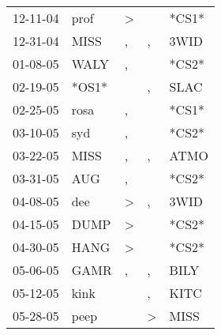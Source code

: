 \begin{supertabular}{p{0.07\textwidth}p{0.06\textwidth}p{0.02\textwidth}p{0.02\textwidth}p{0.06\textwidth}}
          12-11-04\textsuperscript{} &           prof\textsuperscript{} &     \textgreater &                  &                            *CS1* \\
          12-31-04\textsuperscript{} &           MISS\textsuperscript{} &                , &                , &           3WID\textsuperscript{} \\
          01-08-05\textsuperscript{} &           WALY\textsuperscript{} &                , &                  &                            *CS2* \\
          02-19-05\textsuperscript{} &                            *OS1* &                  &                , &           SLAC\textsuperscript{} \\
          02-25-05\textsuperscript{} &           rosa\textsuperscript{} &                , &                  &                            *CS1* \\
          03-10-05\textsuperscript{} &            syd\textsuperscript{} &                , &                  &                            *CS2* \\
          03-22-05\textsuperscript{} &           MISS\textsuperscript{} &                , &                , &           ATMO\textsuperscript{} \\
          03-31-05\textsuperscript{} &            AUG\textsuperscript{} &                , &                  &                            *CS2* \\
          04-08-05\textsuperscript{} &            dee\textsuperscript{} &     \textgreater &                , &           3WID\textsuperscript{} \\
          04-15-05\textsuperscript{} &           DUMP\textsuperscript{} &     \textgreater &                  &                            *CS2* \\
          04-30-05\textsuperscript{} &           HANG\textsuperscript{} &     \textgreater &                  &                            *CS2* \\
          05-06-05\textsuperscript{} &           GAMR\textsuperscript{} &                , &                , &           BILY\textsuperscript{} \\
          05-12-05\textsuperscript{} &           kink\textsuperscript{} &                  &                , &           KITC\textsuperscript{} \\
          05-28-05\textsuperscript{} &           peep\textsuperscript{} &                  &     \textgreater &           MISS\textsuperscript{} \\

\end{supertabular}
